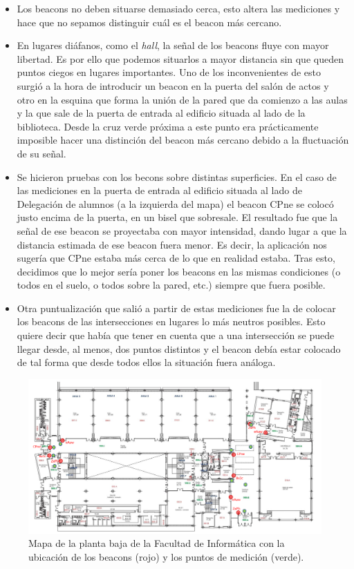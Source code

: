 \begin{itemize}
	\item Los beacons no deben situarse demasiado cerca, esto altera las mediciones y hace que no sepamos distinguir cuál es el beacon más cercano. 
	
	\item En lugares diáfanos, como el \textit{hall}, la señal de los beacons fluye con mayor libertad. Es por ello que podemos situarlos a mayor distancia sin que queden puntos ciegos en lugares importantes. Uno de los inconvenientes de esto surgió a la hora de introducir un beacon en la puerta del salón de actos y otro en la esquina que forma la unión de la pared que da comienzo a las aulas y la que sale de la puerta de entrada al edificio situada al lado de la biblioteca. Desde la cruz verde próxima a este punto era prácticamente imposible hacer una distinción del beacon más cercano debido a la fluctuación de su señal.
	
	\item Se hicieron pruebas con los becons sobre distintas superficies. En el caso de las mediciones en la puerta de entrada al edificio situada al lado de Delegación de alumnos (a la izquierda del mapa) el beacon CPne se colocó justo encima de la puerta, en un bisel que sobresale. El resultado fue que la señal de ese beacon se proyectaba con mayor intensidad, dando lugar a que la distancia estimada de ese beacon fuera menor. Es decir, la aplicación nos sugería que CPne estaba más cerca de lo que en realidad estaba. Tras esto, decidimos que lo mejor sería poner los beacons en las mismas condiciones (o todos en el suelo, o todos sobre la pared, etc.) siempre que fuera posible. 
	
	\item Otra puntualización que salió a partir de estas mediciones fue la de colocar los beacons de las intersecciones en lugares lo más neutros posibles. Esto quiere decir que había que tener en cuenta que a una intersección se puede llegar desde, al menos, dos puntos distintos y el beacon debía estar colocado de tal forma que desde todos ellos la situación fuera análoga. 
\end{itemize}

\begin{figure}[t]
	\centering
	\includegraphics[width=1\textwidth]{Imagenes/Descripciondeltrabajo/medidasPlanoPBaja}
	\caption{Mapa de la planta baja de la Facultad de Informática con la ubicación de los beacons (rojo) y los puntos de medición (verde). }
	\label{fig:medidasPBaja}
\end{figure}

